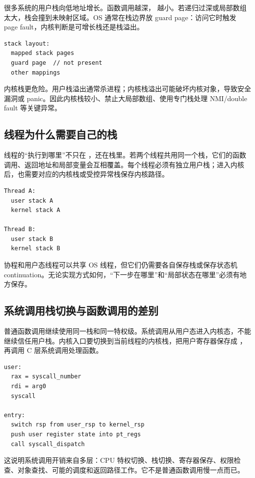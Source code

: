 很多系统的用户栈向低地址增长。函数调用越深， 越小。若递归过深或局部数组太大，栈会撞到未映射区域。OS 通常在栈边界放 guard page：访问它时触发 page fault，内核判断是可增长栈还是栈溢出。

\begin{lstlisting}
stack layout:
  mapped stack pages
  guard page  // not present
  other mappings
\end{lstlisting}

内核栈更危险。用户栈溢出通常杀进程；内核栈溢出可能破坏内核对象，导致安全漏洞或 panic。因此内核栈较小、禁止大局部数组、使用专门栈处理 NMI/double fault 等关键异常。

\subsection{线程为什么需要自己的栈}

线程的“执行到哪里”不只在 ，还在栈里。若两个线程共用同一个栈，它们的函数调用、返回地址和局部变量会互相覆盖。每个线程必须有独立用户栈；进入内核后，也需要对应的内核栈或受控异常栈保存内核路径。

\begin{lstlisting}
Thread A:
  user stack A
  kernel stack A

Thread B:
  user stack B
  kernel stack B
\end{lstlisting}

协程和用户态线程可以共享 OS 线程，但它们仍需要各自保存栈或保存状态机 continuation。无论实现方式如何，“下一步在哪里”和“局部状态在哪里”必须有地方保存。

\subsection{系统调用栈切换与函数调用的差别}

普通函数调用继续使用同一栈和同一特权级。系统调用从用户态进入内核态，不能继续信任用户栈。内核入口要切换到当前线程的内核栈，把用户寄存器保存成 ，再调用 C 层系统调用处理函数。

\begin{lstlisting}
user:
  rax = syscall_number
  rdi = arg0
  syscall

entry:
  switch rsp from user_rsp to kernel_rsp
  push user register state into pt_regs
  call syscall_dispatch
\end{lstlisting}

这说明系统调用开销来自多层：CPU 特权切换、栈切换、寄存器保存、权限检查、对象查找、可能的调度和返回路径工作。它不是普通函数调用慢一点而已。

